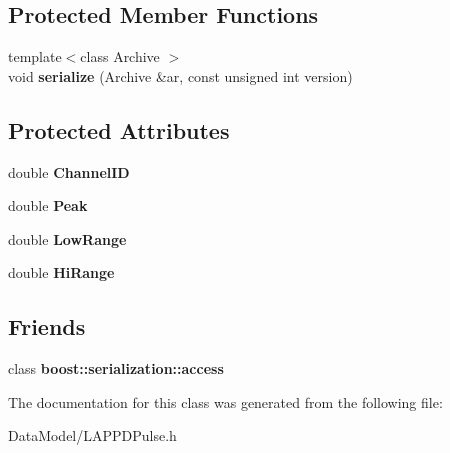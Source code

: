 \subsection*{Protected Member Functions}
\begin{DoxyCompactItemize}
\item 
\hypertarget{classLAPPDPulse_aa51fb4050ecce1aca2beb008a272d766}{{\footnotesize template$<$class Archive $>$ }\\void {\bfseries serialize} (Archive \&ar, const unsigned int version)}\label{classLAPPDPulse_aa51fb4050ecce1aca2beb008a272d766}

\end{DoxyCompactItemize}
\subsection*{Protected Attributes}
\begin{DoxyCompactItemize}
\item 
\hypertarget{classLAPPDPulse_a2e42975bd2fd735b7bd7d7c2bacb683f}{double {\bfseries Channel\-I\-D}}\label{classLAPPDPulse_a2e42975bd2fd735b7bd7d7c2bacb683f}

\item 
\hypertarget{classLAPPDPulse_a72893cf5f3accbe429e2cb1437b02064}{double {\bfseries Peak}}\label{classLAPPDPulse_a72893cf5f3accbe429e2cb1437b02064}

\item 
\hypertarget{classLAPPDPulse_af4923695ff523930e7109fab7743d7c4}{double {\bfseries Low\-Range}}\label{classLAPPDPulse_af4923695ff523930e7109fab7743d7c4}

\item 
\hypertarget{classLAPPDPulse_a5ee5c47716e498114b8924a64a92b562}{double {\bfseries Hi\-Range}}\label{classLAPPDPulse_a5ee5c47716e498114b8924a64a92b562}

\end{DoxyCompactItemize}
\subsection*{Friends}
\begin{DoxyCompactItemize}
\item 
\hypertarget{classLAPPDPulse_ac98d07dd8f7b70e16ccb9a01abf56b9c}{class {\bfseries boost\-::serialization\-::access}}\label{classLAPPDPulse_ac98d07dd8f7b70e16ccb9a01abf56b9c}

\end{DoxyCompactItemize}


The documentation for this class was generated from the following file\-:\begin{DoxyCompactItemize}
\item 
Data\-Model/L\-A\-P\-P\-D\-Pulse.\-h\end{DoxyCompactItemize}
